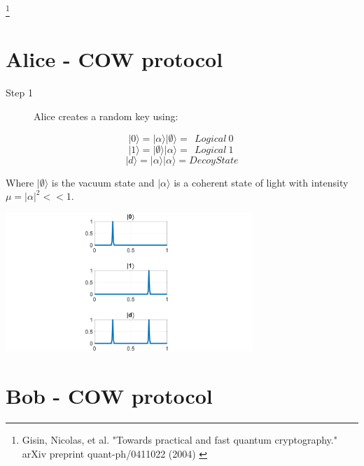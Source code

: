 \documentclass[1000pt]{article}
\newcommand{\mysection}[1]{\section*{\color{black}\sffamily #1}}%
\newcommand{\cref}[1]{{\fontsize{17pt}{0cm}\selectfont\color{black} #1}}%
\newcommand\blfootnote[1]{%
  \begingroup
  \renewcommand\thefootnote{}\footnote{#1}%
  \addtocounter{footnote}{-1}%
  \endgroup
}
\begin{document}
\blfootnote{
\hspace*{12cm}
\begin{minipage}{26cm}
\cref{
Gisin, Nicolas, et al. "Towards practical and fast quantum cryptography." arXiv preprint quant-ph/0411022 (2004)
}
\end{minipage}
}

\mysection{\Huge\textbf{Alice - COW protocol}} \Large \vspace*{1cm}

\begin{multicols}{2}

\begin{description}
  \item[Step 1] Alice creates a random key using:  
\end{description}

$$|0\rangle = |\alpha\rangle |\emptyset\rangle =\ \ Logical\ 0\ $$
  $$|1\rangle = |\emptyset\rangle |\alpha\rangle =\ \ Logical\ 1\ $$
$$|d\rangle = |\alpha\rangle |\alpha\rangle = Decoy State$$

Where $|\emptyset\rangle$ is the vacuum state and $|\alpha\rangle$ is a coherent state of light with intensity $\mu=|\alpha|^2<<1$.

\vspace*{5cm}

\columnbreak
\hspace{-5cm}	
\vspace*{-2cm}
    	\includegraphics[width=0.7\textwidth]{./figures/S1A.pdf}
\vspace*{1cm}
\end{multicols} 


\mysection{\Huge\textbf{Bob - COW protocol}} \Large \vspace*{1cm}
\end{document}

